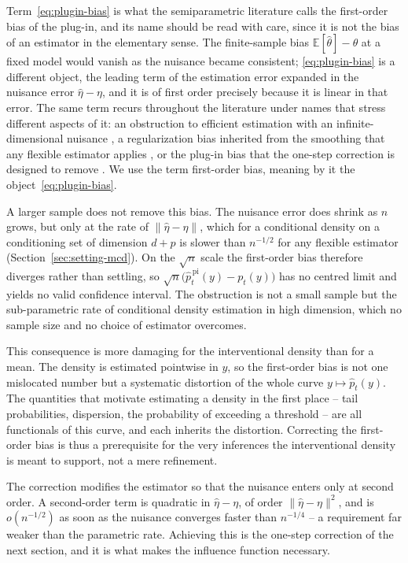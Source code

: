 \documentclass[11pt]{article}
\theoremstyle{plain}
\theoremstyle{definition}
\theoremstyle{remark}
\newcommand{\pE}{\ensuremath{\mathbb{E}}}
\begin{document}
Term~\eqref{eq:plugin-bias} is what the semiparametric literature calls the first-order
bias of the plug-in, and its name should be read with care, since it is not the bias of an
estimator in the elementary sense. The finite-sample bias $\pE[\widehat\theta]-\theta$ at a
fixed model would vanish as the nuisance became consistent; \eqref{eq:plugin-bias} is a
different object, the leading term of the estimation error expanded in the nuisance error
$\widehat\eta-\eta$, and it is of first order precisely because it is linear in that error.
The same term recurs throughout the literature under names that stress different aspects of
it: an obstruction to efficient estimation with an infinite-dimensional nuisance
\citep{bickel1988,robins2008}, a regularization bias inherited from the smoothing that any
flexible estimator applies \citep{chernozhukov2018}, or the plug-in bias that the one-step
correction is designed to remove \citep{vanderlaan2006tmle,kennedy2022review}. We use the
term first-order bias, meaning by it the object~\eqref{eq:plugin-bias}.

A larger sample does not remove this bias. The nuisance error does shrink as $n$ grows, but
only at the rate of $\|\widehat\eta-\eta\|$, which for a conditional density on a
conditioning set of dimension $d+p$ is slower than $n^{-1/2}$ for any flexible estimator
(Section~\ref{sec:setting-mcd}). On the $\sqrt n$ scale the first-order bias therefore
diverges rather than settling, so $\sqrt n\big(\widehat p^{\,\mathrm{pi}}_t(y)-p_t(y)\big)$
has no centred limit and yields no valid confidence interval. The obstruction is not a
small sample but the sub-parametric rate of conditional density estimation in high
dimension, which no sample size and no choice of estimator overcomes.

This consequence is more damaging for the interventional density than for a mean. The
density is estimated pointwise in $y$, so the first-order bias is not one mislocated number
but a systematic distortion of the whole curve $y\mapsto\widehat p_t(y)$. The quantities
that motivate estimating a density in the first place -- tail probabilities, dispersion,
the probability of exceeding a threshold -- are all functionals of this curve, and each
inherits the distortion. Correcting the first-order bias is thus a prerequisite for the
very inferences the interventional density is meant to support, not a mere refinement.

The correction modifies the estimator so that the nuisance enters only at second order. A
second-order term is quadratic in $\widehat\eta-\eta$, of order $\|\widehat\eta-\eta\|^2$,
and is $o(n^{-1/2})$ as soon as the nuisance converges faster than $n^{-1/4}$ -- a
requirement far weaker than the parametric rate. Achieving this is the one-step correction
of the next section, and it is what makes the influence function necessary.
\end{document}

